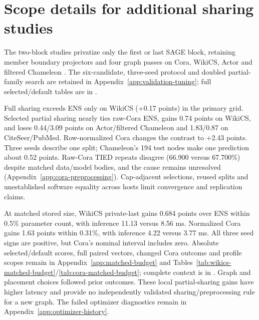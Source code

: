 \section{Scope details for additional sharing studies}\label{app:sharing-scope-summary}
The two-block studies privatize only the first or last SAGE block, retaining member boundary projectors and four graph passes on Cora, WikiCS, Actor and filtered Chameleon \citep{yang2016revisiting,mernyei2020wikics,pei2020geomgcn,platonov2023critical}. The six-candidate, three-seed protocol and doubled partial-family search are retained in Appendix~\ref{app:validation-tuning}; full selected/default tables are in .

Full sharing exceeds ENS only on WikiCS (+0.17 points) in the primary grid. Selected partial sharing nearly ties raw-Cora ENS, gains 0.74 points on WikiCS, and loses 0.44/3.09 points on Actor/filtered Chameleon and 1.83/0.87 on CiteSeer/PubMed. Row-normalized Cora changes the contrast to +2.43 points. Three seeds describe one split; Chameleon's 194 test nodes make one prediction about 0.52 points. Raw-Cora TIED repeats disagree (66.900 versus 67.700\%) despite matched data/model bodies, and the cause remains unresolved (Appendix~\ref{app:cora-preprocessing}). Cap-adjacent selections, reused splits and unestablished software equality across hosts limit convergence and replication claims.

At matched stored size, WikiCS private-last gains 0.684 points over ENS within 0.5\% parameter count, with inference 11.13 versus 8.56 ms. Normalized Cora gains 1.63 points within 0.31\%, with inference 4.22 versus 3.77 ms. All three seed signs are positive, but Cora's nominal interval includes zero. Absolute selected/default scores, full paired vectors, changed Cora outcome and profile scopes remain in Appendix~\ref{app:matched-budget} and Tables~\ref{tab:wikics-matched-budget}/\ref{tab:cora-matched-budget}; complete context is in . Graph and placement choices followed prior outcomes. These local partial-sharing gains have higher latency and provide no independently validated sharing/preprocessing rule for a new graph. The failed optimizer diagnostics remain in Appendix~\ref{app:optimizer-history}.
